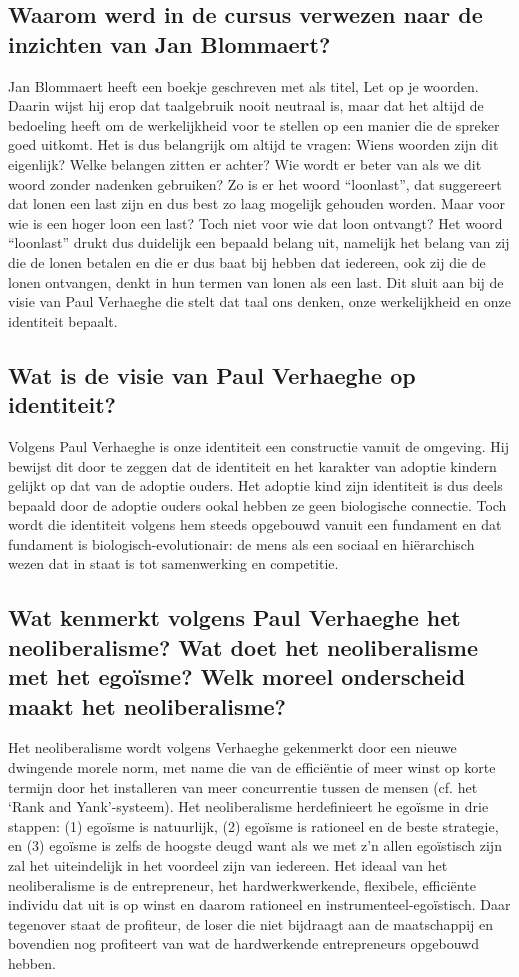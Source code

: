 \documentclass[11pt,a4paper,titlepage]{article}
\begin{document}
\subsection{Waarom werd in de cursus verwezen naar de inzichten van Jan Blommaert?}
Jan Blommaert heeft een boekje geschreven met als titel, Let op je woorden. Daarin wijst hij erop dat taalgebruik nooit neutraal is, maar dat het altijd de bedoeling heeft om de werkelijkheid voor te stellen op een manier die de spreker goed uitkomt. Het is dus belangrijk om altijd te vragen: Wiens woorden zijn dit eigenlijk? Welke belangen zitten er achter? Wie wordt er beter van als we dit woord zonder nadenken gebruiken? Zo is er het woord “loonlast”, dat suggereert dat lonen een last zijn en dus best zo laag mogelijk gehouden worden. Maar voor wie is een hoger loon een last? Toch niet voor wie dat loon ontvangt? Het
woord “loonlast” drukt dus duidelijk een bepaald belang uit, namelijk het belang van zij die de lonen betalen en die er dus baat bij hebben dat iedereen, ook zij die de lonen ontvangen, denkt in hun termen van lonen als een last. Dit sluit aan bij de visie van Paul Verhaeghe die stelt dat taal ons denken, onze werkelijkheid en onze identiteit bepaalt.

\subsection{Wat is de visie van Paul Verhaeghe op identiteit?}
Volgens Paul Verhaeghe is onze identiteit een constructie vanuit de omgeving. Hij bewijst dit door te zeggen dat de identiteit en het karakter van adoptie kindern gelijkt op dat van de adoptie ouders. Het adoptie kind zijn identiteit is dus deels bepaald door de adoptie ouders ookal hebben ze geen biologische connectie. Toch wordt die identiteit volgens hem steeds opgebouwd vanuit een fundament en dat fundament is biologisch-evolutionair: de mens als een sociaal en hiërarchisch wezen dat in staat is tot samenwerking en competitie.

\subsection{Wat kenmerkt volgens Paul Verhaeghe het neoliberalisme? Wat doet het neoliberalisme met het egoïsme? Welk moreel onderscheid maakt het neoliberalisme?}
Het neoliberalisme wordt volgens Verhaeghe gekenmerkt door een nieuwe dwingende morele norm, met name die van de efficiëntie of meer winst op korte termijn door het installeren van meer concurrentie tussen de mensen (cf. het ‘Rank and Yank’-systeem). Het neoliberalisme herdefinieert he egoïsme in drie stappen: (1) egoïsme is natuurlijk, (2) egoïsme is rationeel en de beste strategie, en (3) egoïsme is zelfs de hoogste deugd want als we met z’n allen egoïstisch zijn zal het uiteindelijk in het voordeel zijn van iedereen. Het ideaal van het neoliberalisme is de entrepreneur, het hardwerkwerkende, flexibele,
efficiënte individu dat uit is op winst en daarom rationeel en instrumenteel-egoïstisch. Daar tegenover staat de profiteur, de loser die niet bijdraagt aan de maatschappij en bovendien nog profiteert van wat de hardwerkende entrepreneurs opgebouwd hebben.
\end{document}
